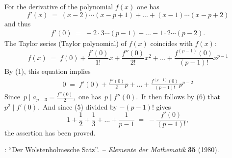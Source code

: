 \documentclass[12pt]{article}
\theoremstyle{definition}
\begin{document}
For the derivative of the polynomial $f(x)$ one has
$$f'(x) \;=\; (x\!-\!2)\cdots(x\!-\!p\!+\!1)+\ldots+(x\!-\!1)\cdots(x\!-\!p\!+\!2)$$
and thus
\begin{align}
f'(0) \;=\; -2\cdot3\cdots(p\!-\!1)-\ldots-1\cdot2\cdots(p\!-\!2).
\end{align}
The Taylor series (Taylor polynomial) of $f(x)$ coincides with $f(x)$:
$$f(x) \;=\; f(0)+\frac{f'(0)}{1!}x+\frac{f''(0)}{2!}x^2+\ldots+\frac{f^{(p-1)}(0)}{(p\!-\!1)!}x^{p-1}$$
By (1), this equation implies
\begin{align}
0 \;=\; f'(0)+\frac{f''(0)}{2}p+\ldots+\frac{f^{(p-1)}(0)}{(p\!-\!1)!}p^{p-2}
\end{align}
Since\, $p \mid a_{p-3} = \frac{f''(0)}{2}$,\, one has\, $p \mid f''(0)$.\, It then follows by (6) that\, $p^2 \mid f'(0)$.\, And since (5) divided by $-(p\!-\!1)!$ gives
$$1+\frac{1}{2}+\frac{1}{3}+\ldots+\frac{1}{p-1} \;=\; -\frac{f'(0)}{(p\!-\!1)!},$$
the assertion has been proved.

\begin{thebibliography}{8}
: ``Der Wolstenholmesche Satz''.\, -- \emph{Elemente der Mathematik} \textbf{35} (1980).
\end{thebibliography}
\end{document}
